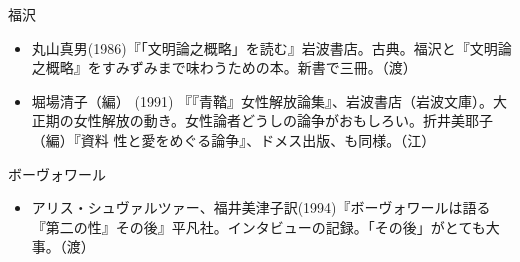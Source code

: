 \documentclass[dvipdfmx]{jsarticle}
\begin{document}
福沢

\begin{itemize}
\item 丸山真男(1986)『「文明論之概略」を読む』岩波書店。古典。福沢と『文明論之概略』をすみずみまで味わうための本。新書で三冊。（渡）
\item 堀場清子（編） (1991) 『『青鞜』女性解放論集』、岩波書店（岩波文庫）。大正期の女性解放の動き。女性論者どうしの論争がおもしろい。折井美耶子（編）『資料 性と愛をめぐる論争』、ドメス出版、も同様。（江）
\end{itemize}

ボーヴォワール

\begin{itemize}
\item  アリス・シュヴァルツァー、福井美津子訳(1994)『ボーヴォワールは語る　『第二の性』その後』平凡社。インタビューの記録。「その後」がとても大事。（渡）
\end{itemize}
\end{document}
